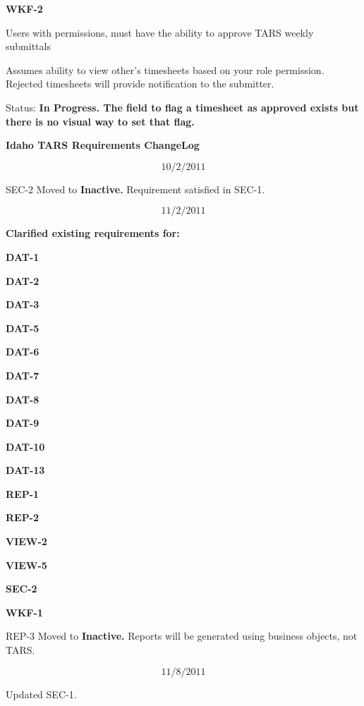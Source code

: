 \documentclass{article}
\begin{document}
\noindent \textbf{WKF-2}

\noindent Users with permissions, must have the ability to approve TARS weekly submittals

\noindent Assumes ability to view other's timesheets based on your role permission. Rejected timesheets will provide notification to the submitter.

\noindent Status: \textbf{In Progress.  The field to flag a timesheet as approved exists but there is no visual way to set that flag.}

\noindent \textit{}
\noindent \textit{}
\noindent \textit{}


\noindent \textbf{Idaho TARS Requirements ChangeLog}

\noindent 
\[10/2/2011\] 

 SEC-2 Moved to \textbf{Inactive. }Requirement satisfied in SEC-1.

\noindent 
\[11/2/2011\] 

 \textbf{Clarified existing requirements for:}

\textbf{  DAT-1}

\textbf{  DAT-2}

\textbf{  DAT-3}

\noindent \textbf{DAT-5}

\noindent \textbf{DAT-6}

\noindent \textbf{DAT-7}

\noindent \textbf{DAT-8}

\noindent \textbf{DAT-9}

\noindent \textbf{DAT-10}

\noindent \textbf{DAT-13}

\noindent \textbf{REP-1}

\noindent \textbf{REP-2}

\noindent \textbf{VIEW-2}

\noindent \textbf{VIEW-5}

\noindent \textbf{SEC-2}

\noindent \textbf{WKF-1}

  

 REP-3 Moved to \textbf{Inactive. }Reports will be generated using business objects, not TARS.

\noindent 
\[11/8/2011\] 

 Updated SEC-1. 

\textbf{ }
\end{document}
